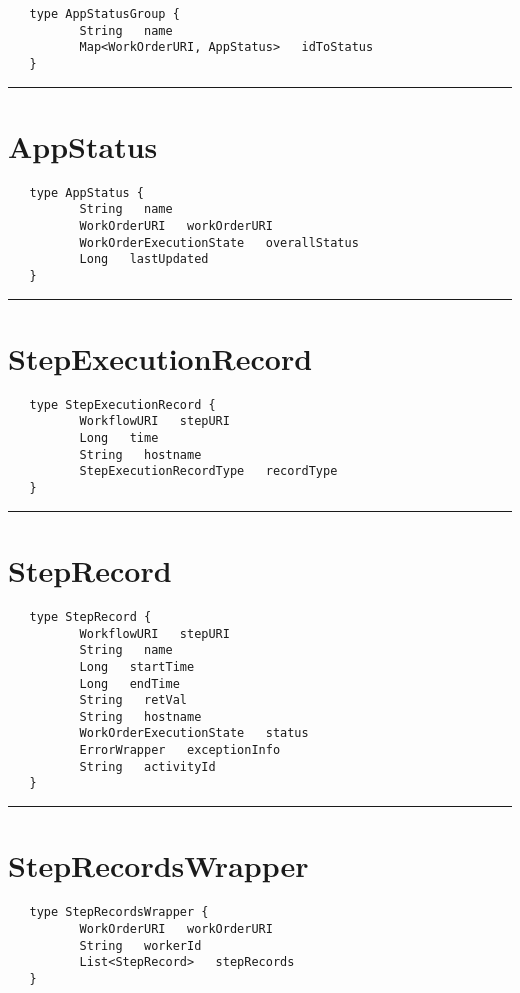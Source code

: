 \begin{verbatim}
   type AppStatusGroup {
          String   name
          Map<WorkOrderURI, AppStatus>   idToStatus
   }
\end{verbatim}

\rule{15cm}{2pt}
\section{AppStatus}
\label{type:AppStatus}

\begin{verbatim}
   type AppStatus {
          String   name
          WorkOrderURI   workOrderURI
          WorkOrderExecutionState   overallStatus
          Long   lastUpdated
   }
\end{verbatim}

\rule{15cm}{2pt}
\section{StepExecutionRecord}
\label{type:StepExecutionRecord}

\begin{verbatim}
   type StepExecutionRecord {
          WorkflowURI   stepURI
          Long   time
          String   hostname
          StepExecutionRecordType   recordType
   }
\end{verbatim}

\rule{15cm}{2pt}
\section{StepRecord}
\label{type:StepRecord}

\begin{verbatim}
   type StepRecord {
          WorkflowURI   stepURI
          String   name
          Long   startTime
          Long   endTime
          String   retVal
          String   hostname
          WorkOrderExecutionState   status
          ErrorWrapper   exceptionInfo
          String   activityId
   }
\end{verbatim}

\rule{15cm}{2pt}
\section{StepRecordsWrapper}
\label{type:StepRecordsWrapper}

\begin{verbatim}
   type StepRecordsWrapper {
          WorkOrderURI   workOrderURI
          String   workerId
          List<StepRecord>   stepRecords
   }
\end{verbatim}

